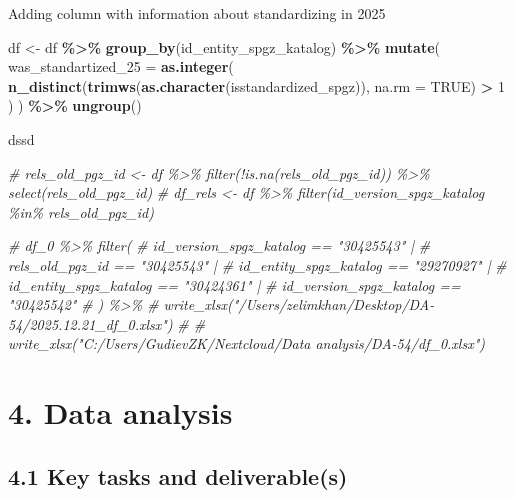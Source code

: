 \documentclass[
]{article}
\newenvironment{Shaded}{\begin{snugshade}}{\end{snugshade}}
\newcommand{\AttributeTok}[1]{\textcolor[rgb]{0.13,0.29,0.53}{#1}}
\newcommand{\CommentTok}[1]{\textcolor[rgb]{0.56,0.35,0.01}{\textit{#1}}}
\newcommand{\ConstantTok}[1]{\textcolor[rgb]{0.56,0.35,0.01}{#1}}
\newcommand{\DecValTok}[1]{\textcolor[rgb]{0.00,0.00,0.81}{#1}}
\newcommand{\FunctionTok}[1]{\textcolor[rgb]{0.13,0.29,0.53}{\textbf{#1}}}
\newcommand{\NormalTok}[1]{#1}
\newcommand{\OtherTok}[1]{\textcolor[rgb]{0.56,0.35,0.01}{#1}}
\newcommand{\SpecialCharTok}[1]{\textcolor[rgb]{0.81,0.36,0.00}{\textbf{#1}}}
\begin{document}
Adding column with information about standardizing in 2025

\begin{Shaded}
\begin{Highlighting}[]
\NormalTok{df }\OtherTok{\textless{}{-}}\NormalTok{ df }\SpecialCharTok{\%\textgreater{}\%} 
  \FunctionTok{group\_by}\NormalTok{(id\_entity\_spgz\_katalog) }\SpecialCharTok{\%\textgreater{}\%} 
  \FunctionTok{mutate}\NormalTok{(}
    \AttributeTok{was\_standartized\_25 =} \FunctionTok{as.integer}\NormalTok{(}
      \FunctionTok{n\_distinct}\NormalTok{(}\FunctionTok{trimws}\NormalTok{(}\FunctionTok{as.character}\NormalTok{(isstandardized\_spgz)), }\AttributeTok{na.rm =} \ConstantTok{TRUE}\NormalTok{) }\SpecialCharTok{\textgreater{}} \DecValTok{1}
\NormalTok{      )}
\NormalTok{    ) }\SpecialCharTok{\%\textgreater{}\%} 
  \FunctionTok{ungroup}\NormalTok{()}
\end{Highlighting}
\end{Shaded}

dssd

\begin{Shaded}
\begin{Highlighting}[]
\CommentTok{\# rels\_old\_pgz\_id \textless{}{-} df \%\textgreater{}\% filter(!is.na(rels\_old\_pgz\_id)) \%\textgreater{}\% select(rels\_old\_pgz\_id)}
\CommentTok{\# df\_rels \textless{}{-} df \%\textgreater{}\% filter(id\_version\_spgz\_katalog \%in\% rels\_old\_pgz\_id)}

\CommentTok{\# df\_0 \%\textgreater{}\% filter(}
\CommentTok{\#   id\_version\_spgz\_katalog == "30425543" |}
\CommentTok{\#     rels\_old\_pgz\_id == "30425543" |}
\CommentTok{\#     id\_entity\_spgz\_katalog == "29270927" |}
\CommentTok{\#     id\_entity\_spgz\_katalog == "30424361" |}
\CommentTok{\#     id\_version\_spgz\_katalog == "30425542"}
\CommentTok{\# ) \%\textgreater{}\% \# write\_xlsx("/Users/zelimkhan/Desktop/DA{-}54/2025.12.21\_df\_0.xlsx")}
\CommentTok{\#    \# write\_xlsx("C:/Users/GudievZK/Nextcloud/Data analysis/DA{-}54/df\_0.xlsx")}
\end{Highlighting}
\end{Shaded}

\newpage

\section{\texorpdfstring{\textbf{4. Data
analysis}}{4. Data analysis}}\label{data-analysis}

\subsection{\texorpdfstring{\textbf{4.1 Key tasks and
deliverable(s)}}{4.1 Key tasks and deliverable(s)}}\label{key-tasks-and-deliverables-1}
\end{document}
